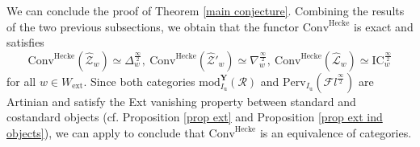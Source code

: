 \documentclass[11pt]{amsart}
\theoremstyle{plain}
\theoremstyle{remark}
\numberwithin{equation}{section}
\begin{document}
We can conclude the proof of Theorem \ref{main conjecture}. Combining the results of the two previous subsections, we obtain that the functor $\mathrm{Conv}^{\mathrm{Hecke}}$ is exact and satisfies 
$$\mathrm{Conv}^{\mathrm{Hecke}}(\widehat{\mathcal{Z}}_w)\simeq \Delta^{\frac{\infty}{2}}_{w},~\mathrm{Conv}^{\mathrm{Hecke}}(\widehat{\mathcal{Z}}'_w)\simeq \nabla^{\frac{\infty}{2}}_{w},~\mathrm{Conv}^{\mathrm{Hecke}}(\widehat{\mathcal{L}}_w)\simeq \mathrm{IC}^{\frac{\infty}{2}}_{w}$$
for all $w\in W_{\mathrm{ext}}$. Since both categories $\mathrm{mod}^\mathbf{Y}_{I_\mathrm{u}}(\mathcal{R})$ and $\mathrm{Perv}_{{I_\mathrm{u}}}(\mathcal{F}l^{\frac{\infty}{2}})$ are Artinian and satisfy the Ext vanishing property between standard and costandard objects (cf. Proposition \ref{prop ext} and Proposition \ref{prop ext ind objects}), we can apply \cite[Lemma 6.2.7]{ABBGM} to conclude that $\mathrm{Conv}^{\mathrm{Hecke}}$ is an equivalence of categories.





	
	
\end{document}
